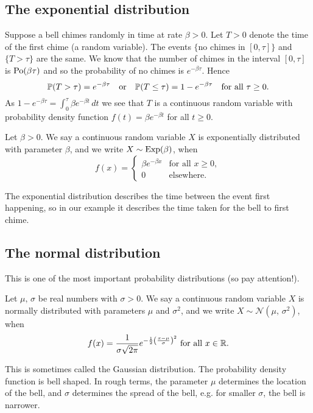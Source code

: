 \documentclass[10pt, a4paper]{article}
\begin{document}
\subsection{The exponential distribution}
Suppose a bell chimes randomly in time at rate $\beta > 0$.
Let $T > 0$ denote the time of the first chime
(a random variable).
The events $\{\text{no chimes in } [0, \tau]\}$ and $\{T > \tau\}$ are the same.
We know that the number of chimes in the interval $[0, \tau]$ is $\Po(\beta\tau)$ and so the probability of no chimes is $e ^ {-\beta\tau}$.
Hence
\[
\P(T > \tau) = e ^ {-\beta\tau}\quad\text{or}\quad\P(T \leq \tau) = 1 - e ^ {-\beta\tau}\quad\text{for all } \tau \geq 0.
\]
As $1 - e ^ {-\beta\tau} = \int_0^\tau\beta e ^ {-\beta t}\,dt$ we see that $T$ is a continuous random variable with probability density function
$f(t) = \beta e ^ {-\beta t}$ for all $t \geq 0$.

\begin{definition}
    Let $\beta > 0$.
    We say a continuous random variable $X$ is exponentially distributed with parameter $\beta$,
    and we write $X \sim \Exp(\beta)$, when
    \[
    f(x) = \begin{cases}
        \beta e ^ {-\beta x} & \text{for all } x \geq 0, \\
        0 & \text{elsewhere}.
    \end{cases}
    \]
\end{definition}

The exponential distribution describes the time between the event first happening,
so in our example it describes the time taken for the bell to first chime.

\subsection{The normal distribution}
This is one of the most important probability distributions (so pay attention!).
\begin{definition}
    Let $\mu,\,\sigma$ be real numbers with $\sigma > 0$.
    We say a continuous random variable $X$ is normally distributed with parameters $\mu$ and $\sigma ^ 2$,
    and we write $X \sim \mathcal{N}(\mu,\,\sigma ^ 2)$, when
    \[
    f(x) =\frac{1}{\sigma\sqrt{2\pi}}e ^ {-\frac{1}{2}\left(\frac{x - \mu}{\sigma}\right) ^ 2}\text{ for all } x \in \R.
    \]
\end{definition}
This is sometimes called the Gaussian distribution.
The probability density function is bell shaped.
In rough terms,
the parameter $\mu$ determines the location of the bell,
and $\sigma$ determines the spread of the bell,
e.g. for smaller $\sigma$,
the bell is narrower.
\end{document}
